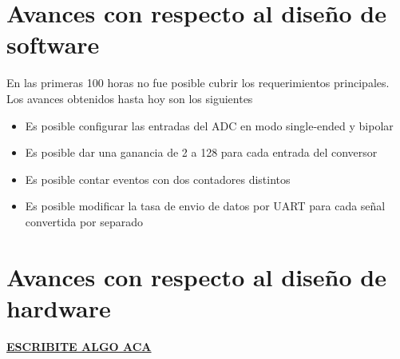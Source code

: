 \section{Avances con respecto al dise\~no de software} %
\label{sec:avances_con_respecto_al_diseno_de_software}

En las primeras 100 horas no fue posible cubrir los requerimientos principales. Los avances obtenidos hasta hoy son los siguientes

\begin{itemize}
  \item Es posible configurar las entradas del ADC en modo single-ended y bipolar
  \item Es posible dar una ganancia de 2 a 128 para cada entrada del conversor
  \item Es posible contar eventos con dos contadores distintos
  \item Es posible modificar la tasa de envio de datos por UART para cada se\~nal convertida por separado
\end{itemize}


\section{Avances con respecto al dise\~no de hardware} %
\label{sec:avances_con_respecto_al_diseno_de_hardware}

\textbf{\underline{ESCRIBITE ALGO ACA}}

